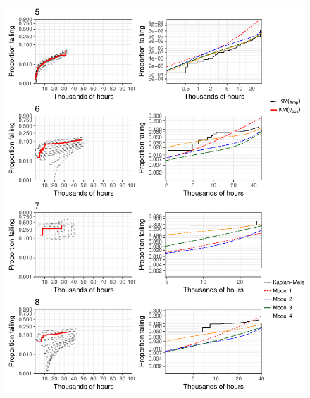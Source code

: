\documentclass[12pt]{article}
\begin{document}
\begin{figure}[H]
\includegraphics[width=\textwidth]{ppcheck-v2-2}
\end{figure}
\end{document}

